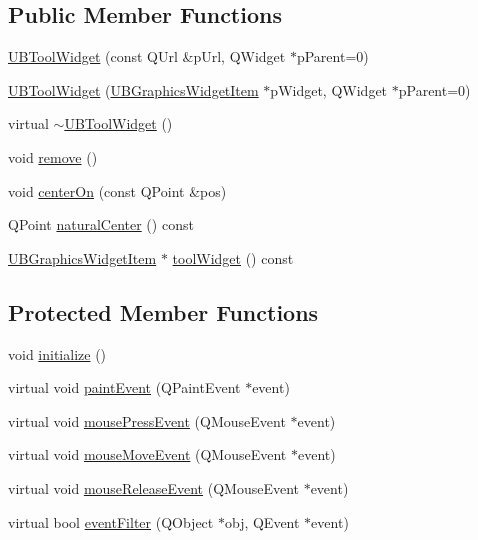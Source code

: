 \subsection*{Public Member Functions}
\begin{DoxyCompactItemize}
\item 
\hyperlink{class_u_b_tool_widget_abaee16f9c07e6672be2b69c7493ac907}{U\-B\-Tool\-Widget} (const Q\-Url \&p\-Url, Q\-Widget $\ast$p\-Parent=0)
\item 
\hyperlink{class_u_b_tool_widget_a47c6e16b1105ff5c88a77513eed06675}{U\-B\-Tool\-Widget} (\hyperlink{class_u_b_graphics_widget_item}{U\-B\-Graphics\-Widget\-Item} $\ast$p\-Widget, Q\-Widget $\ast$p\-Parent=0)
\item 
virtual \hyperlink{class_u_b_tool_widget_a1afd6d2fe6631d8e1901249e0c374e38}{$\sim$\-U\-B\-Tool\-Widget} ()
\item 
void \hyperlink{class_u_b_tool_widget_a72810815961c9a26920c0e6ba2b6d773}{remove} ()
\item 
void \hyperlink{class_u_b_tool_widget_aed17e0903eceaf4510c0e2eaa3081e2b}{center\-On} (const Q\-Point \&pos)
\item 
Q\-Point \hyperlink{class_u_b_tool_widget_a9b034038fe18853807826c93ab793470}{natural\-Center} () const 
\item 
\hyperlink{class_u_b_graphics_widget_item}{U\-B\-Graphics\-Widget\-Item} $\ast$ \hyperlink{class_u_b_tool_widget_a249e84f1b176bc3df2b5223157d36747}{tool\-Widget} () const 
\end{DoxyCompactItemize}
\subsection*{Protected Member Functions}
\begin{DoxyCompactItemize}
\item 
void \hyperlink{class_u_b_tool_widget_af4bde7866db04746f6153e8c88f55dc9}{initialize} ()
\item 
virtual void \hyperlink{class_u_b_tool_widget_acacf313f38cc8a50bcb4774986dad909}{paint\-Event} (Q\-Paint\-Event $\ast$event)
\item 
virtual void \hyperlink{class_u_b_tool_widget_a945376b4e6de5349c6c12539346111c2}{mouse\-Press\-Event} (Q\-Mouse\-Event $\ast$event)
\item 
virtual void \hyperlink{class_u_b_tool_widget_a6c3f3902758d34d39852e262bb12c730}{mouse\-Move\-Event} (Q\-Mouse\-Event $\ast$event)
\item 
virtual void \hyperlink{class_u_b_tool_widget_adc43c4c0d6cb3e0f5881df830775b5b7}{mouse\-Release\-Event} (Q\-Mouse\-Event $\ast$event)
\item 
virtual bool \hyperlink{class_u_b_tool_widget_a257e8227aae8e71a812a0662195efba1}{event\-Filter} (Q\-Object $\ast$obj, Q\-Event $\ast$event)
\end{DoxyCompactItemize}
